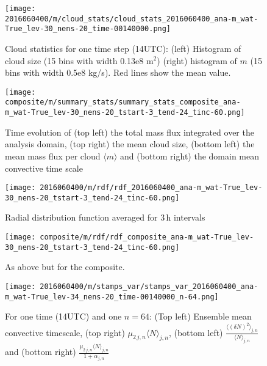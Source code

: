 \documentclass[a4paper, 12pt]{article}
\begin{document}
\begin{figure}[ht]
\noindent \centering
\texttt{[image: 2016060400/m/cloud\_stats/cloud\_stats\_2016060400\_ana-m\_wat-True\_lev-30\_nens-20\_time-00140000.png]}\\
\caption{Cloud statistics for one time step (14UTC): (left) Histogram of cloud size (15 bins with width 0.13e8 m$^2$) (right) histogram of $m$ (15 bins with width 0.5e8 kg/s). Red lines show the mean value.} \label{fig:ex_cloud_stats}
\end{figure}

\begin{figure}[ht]
\noindent \centering
\texttt{[image: composite/m/summary\_stats/summary\_stats\_composite\_ana-m\_wat-True\_lev-30\_nens-20\_tstart-3\_tend-24\_tinc-60.png]}\\
\caption{Time evolution of (top left) the total mass flux integrated over the analysis domain, (top right) the mean cloud size, (bottom left) the mean mass flux per cloud $\langle m \rangle$ and (bottom right) the domain mean convective time scale} \label{fig:comp_summary_stats}
\end{figure}

\begin{figure}[ht]
\noindent \centering
\texttt{[image: 2016060400/m/rdf/rdf\_2016060400\_ana-m\_wat-True\_lev-30\_nens-20\_tstart-3\_tend-24\_tinc-60.png]}\\
\caption{Radial distribution function averaged for 3\,h intervals} \label{fig:ex_rdf}
\end{figure}

\begin{figure}[ht]
\noindent \centering
\texttt{[image: composite/m/rdf/rdf\_composite\_ana-m\_wat-True\_lev-30\_nens-20\_tstart-3\_tend-24\_tinc-60.png]}\\
\caption{As above but for the composite.} \label{fig:comp_rdf}
\end{figure}

\begin{figure}[ht]
\noindent \centering
\texttt{[image: 2016060400/m/stamps\_var/stamps\_var\_2016060400\_ana-m\_wat-True\_lev-34\_nens-20\_time-00140000\_n-64.png]}\\
\caption{For one time (14UTC) and one $n=64$: (Top left) Ensemble mean convective timescale, (top right) $\mu_{2\,j,n}\langle N \rangle_{j,n}$, (bottom left) $\frac{\langle (\delta N)^2 \rangle_{j,n}}{\langle N \rangle_{j,n}}$ and (bottom right) $\frac{\mu_{2\,j,n}\langle N\rangle_{j,n}}{1 + \alpha_{j,n}}$} \label{fig:ex_stamps_var}
\end{figure}
\end{document}
